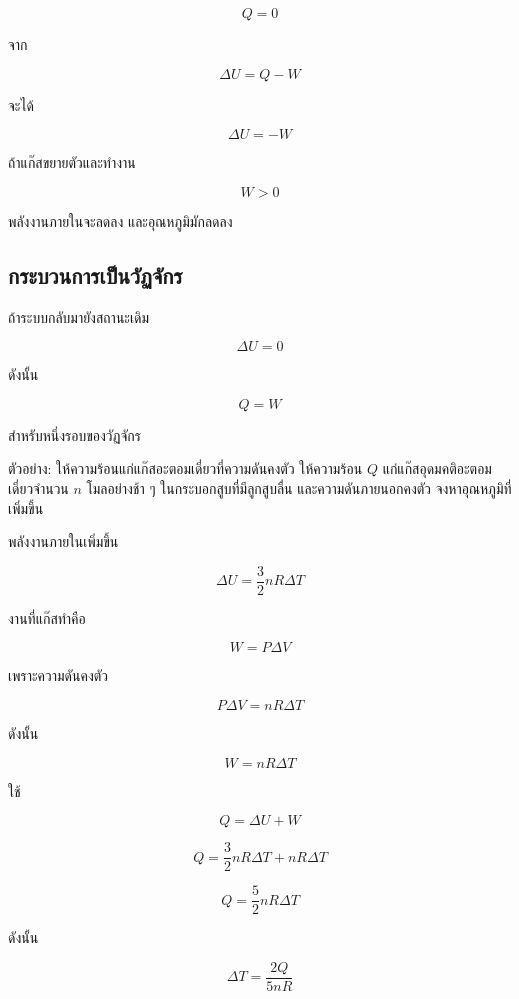\[
Q=0
\]

จาก

\[
\Delta U=Q-W
\]

จะได้

\[
\boxed{
\Delta U=-W
}
\]

ถ้าแก๊สขยายตัวและทำงาน

\[
W>0
\]

พลังงานภายในจะลดลง และอุณหภูมิมักลดลง

\subsection{กระบวนการเป็นวัฏจักร}

ถ้าระบบกลับมายังสถานะเดิม

\[
\Delta U=0
\]

ดังนั้น

\[
\boxed{Q=W}
\]

สำหรับหนึ่งรอบของวัฏจักร

\begin{examplebox}{ตัวอย่าง: ให้ความร้อนแก่แก๊สอะตอมเดี่ยวที่ความดันคงตัว}
ให้ความร้อน $Q$ แก่แก๊สอุดมคติอะตอมเดี่ยวจำนวน $n$ โมลอย่างช้า ๆ ในกระบอกสูบที่มีลูกสูบลื่น และความดันภายนอกคงตัว จงหาอุณหภูมิที่เพิ่มขึ้น

พลังงานภายในเพิ่มขึ้น

\[
\Delta U
=
\frac{3}{2}nR\Delta T
\]

งานที่แก๊สทำคือ

\[
W=P\Delta V
\]

เพราะความดันคงตัว

\[
P\Delta V=nR\Delta T
\]

ดังนั้น

\[
W=nR\Delta T
\]

ใช้

\[
Q=\Delta U+W
\]

\[
Q
=
\frac{3}{2}nR\Delta T+nR\Delta T
\]

\[
Q
=
\frac{5}{2}nR\Delta T
\]

ดังนั้น

\[
\boxed{
\Delta T
=
\frac{2Q}{5nR}
}
\]
\end{examplebox}

